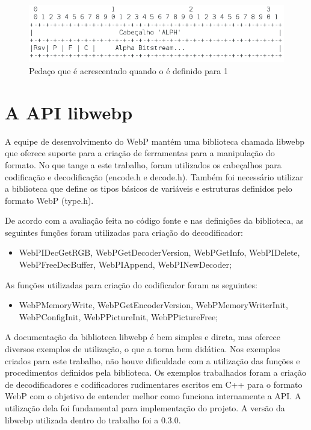 \documentclass[espaco=simples,appendix=Name]{abnt}
\begin{document}
\begin{figure}[h]
  \centering
    \includegraphics[scale=0.4]{AlphaChunk.png}
  \caption{Pedaço que é acrescentado quando o  é definido para 1}
\end{figure}

\section{A API libwebp}

A equipe de desenvolvimento do WebP mantém uma biblioteca chamada libwebp que oferece suporte para a criação de ferramentas para a manipulação do formato. No que tange a este trabalho, foram utilizados os cabeçalhos para codificação e decodificação (encode.h e decode.h). Também foi necessário utilizar a biblioteca que define os tipos básicos de variáveis e estruturas definidos pelo formato WebP (type.h).

De acordo com a avaliação feita no código fonte e nas definições da biblioteca, as seguintes funções foram utilizadas para criação do decodificador:

\begin{itemize}
	\item WebPIDecGetRGB, WebPGetDecoderVersion, WebPGetInfo, WebPIDelete, WebPFreeDecBuffer, WebPIAppend, WebPINewDecoder;
\end{itemize}

As funções utilizadas para criação do codificador foram as seguintes:

\begin{itemize}
	\item WebPMemoryWrite, WebPGetEncoderVersion, WebPMemoryWriterInit, WebPConfigInit, WebPPictureInit, WebPPictureFree;
\end{itemize}

A documentação da biblioteca libwebp é bem simples e direta, mas oferece diversos exemplos de utilização, o que a torna bem didática. Nos exemplos criados para este trabalho, não houve dificuldade com a utilização das funções e procedimentos definidos pela biblioteca. Os exemplos trabalhados foram a criação de decodificadores e codificadores rudimentares escritos em C++ para o formato WebP com o objetivo de entender melhor como funciona internamente a API. A utilização dela foi fundamental para implementação do projeto. A versão da libwebp utilizada dentro do trabalho foi a 0.3.0.
\end{document}
